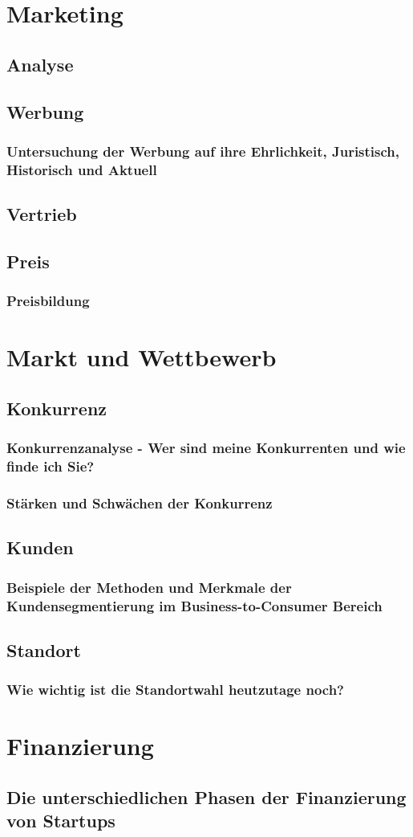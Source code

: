 \chapter{Marketing}
\section{Analyse}
\section{Werbung}
\subsection{Untersuchung der Werbung auf ihre Ehrlichkeit, Juristisch, Historisch und Aktuell}

\section{Vertrieb}
\section{Preis}
\subsection{Preisbildung}

\chapter{Markt und Wettbewerb}
\section{Konkurrenz}
\subsection{Konkurrenzanalyse - Wer sind meine Konkurrenten und wie finde ich Sie?}

\subsection{Stärken und Schwächen der Konkurrenz}

\section{Kunden}
\subsection{Beispiele der Methoden und Merkmale der Kundensegmentierung im Business-to-Consumer Bereich}

\section{Standort}
\subsection{Wie wichtig ist die Standortwahl heutzutage noch?}

\chapter{Finanzierung}
\section{Die unterschiedlichen Phasen der Finanzierung von Startups}

